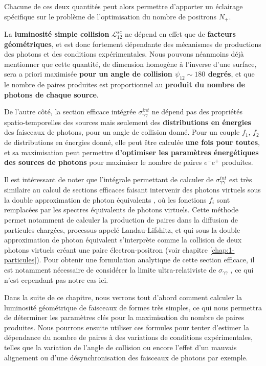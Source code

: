 \begin{refsection}
Chacune de ces deux quantités peut alors permettre d'apporter un éclairage spécifique sur le problème de l'optimisation du nombre de positrons $N_+$.

La \textbf{luminosité simple collision} $\mathcal{L}_{12}^{sc}$ ne dépend en effet que de \textbf{facteurs géométriques}, et est donc fortement dépendante des mécanismes de productions des photons et des conditions expérimentales. Nous pouvons néanmoins déjà mentionner que cette quantité, de dimension homogène à l'inverse d'une surface, sera a priori maximisée \textbf{pour un angle de collision $\psi_{12} \sim 180$ degrés}, et que le nombre de paires produites est proportionnel au \textbf{produit du nombre de photons de chaque source}. 

De l'autre côté, la section efficace intégrée $\sigma_{\gamma\gamma}^{int}$ ne dépend pas des propriétés spatio-temporelles des sources mais seulement des \textbf{distributions en énergies} des faisceaux de photons, pour un angle de collision donné. Pour un couple $f_1$, $f_2$ de distributions en énergies donné, elle peut être calculée \textbf{une fois pour toutes}, et sa maximisation peut permettre \textbf{d'optimiser les paramètres énergétiques des sources de photons} pour maximiser le nombre de paires $e^-e^+$ produites.

Il est intéressant de noter que l'intégrale permettant de calculer de $\sigma_{\gamma\gamma}^{int}$ est très similaire au calcul de sections efficaces faisant intervenir des photons virtuels sous la double approximation de photon équivalents \parencite{greiner_2009, kessler_1974}, où les fonctions $f_i$ sont remplacées par les spectres équivalents de photons virtuels. Cette méthode permet notamment de calculer la production de paires dans la diffusion de particules chargées, processus appelé Landau-Lifshitz, et qui sous la double approximation de photon équivalent s'interprète comme la collision de deux photons virtuels créant une paire électron-positron (voir chapitre \ref{chap:1-particules}). Pour obtenir une formulation analytique de cette section efficace, il est notamment nécessaire de considérer la limite ultra-relativiste de $\sigma_{\gamma\gamma}$ \parencite{greiner_2009}, ce qui n'est cependant pas notre cas ici. 

Dans la suite de ce chapitre, nous verrons tout d'abord comment calculer la luminosité géométrique de faisceaux de formes très simples, ce qui nous permettra de déterminer les paramètres clés pour la maximisation du nombre de paires produites. Nous pourrons ensuite utiliser ces formules pour tenter d'estimer la dépendance du nombre de paires à des variations de conditions expérimentales, telles que la variation de l'angle de collision ou encore l'effet d'un mauvais alignement ou d'une désynchronisation des faisceaux de photons par exemple. 


\end{refsection}
